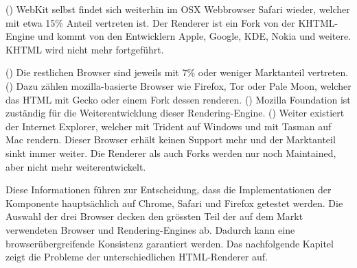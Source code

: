 (\cite{webkitRenderer}) WebKit selbst findet sich weiterhin im OSX Webbrowser Safari wieder, welcher mit etwa 15\% Anteil vertreten ist.
Der Renderer ist ein Fork von der KHTML-Engine und kommt von den Entwicklern Apple, Google, KDE, Nokia und weitere. 
KHTML wird nicht mehr fortgeführt.

(\cite{geckoRenderer}) Die restlichen Browser sind jeweils mit 7\% oder weniger Marktanteil vertreten.
(\cite{mozillaBrowser}) Dazu zählen mozilla-basierte Browser wie Firefox, Tor oder Pale Moon, welcher das HTML mit Gecko oder einem Fork dessen renderen.
(\cite{geckoRenderer}) Mozilla Foundation ist zuständig für die Weiterentwicklung dieser Rendering-Engine.
(\cite{otherRenderer}) Weiter existiert der Internet Explorer, welcher mit Trident auf Windows und mit Tasman auf Mac rendern.
Dieser Browser erhält keinen Support mehr und der Marktanteil sinkt immer weiter.
Die Renderer als auch Forks werden nur noch Maintained, aber nicht mehr weiterentwickelt.

Diese Informationen führen zur Entscheidung, dass die Implementationen der Komponente hauptsächlich auf Chrome, Safari und Firefox getestet werden.
Die Auswahl der drei Browser decken den grössten Teil der auf dem Markt verwendeten Browser und Rendering-Engines ab.
Dadurch kann eine browserübergreifende Konsistenz garantiert werden.
Das nachfolgende Kapitel zeigt die Probleme der unterschiedlichen HTML-Renderer auf.
